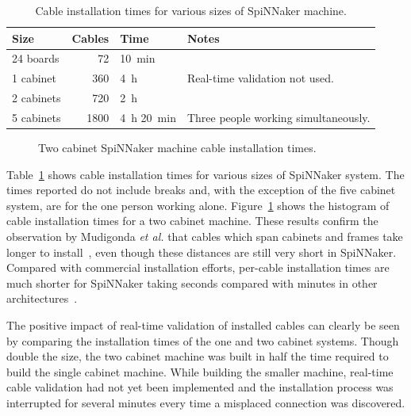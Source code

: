 			\begin{table}
				\center
				\begin{tabular}{lrll}
					\toprule
						Size & Cables & Time & Notes \\
					\midrule
						24 boards  & \num{72}   & \SI{10}{\minute} & \\
						1 cabinet  & \num{360}  & \SI{4}{\hour} &
							Real-time validation not used. \\
						2 cabinets & \num{720}  & \SI{2}{\hour} & \\
						5 cabinets & \num{1800} & \SI{4}{\hour} \SI{20}{\minute} &
							Three people working simultaneously. \\
					\bottomrule
				\end{tabular}
				
				\caption[Cable installation times for various SpiNNaker machines.]%
				{Cable installation times for various sizes of SpiNNaker
				machine.}
				\label{tab:install-time}
			\end{table}
			
			\begin{figure}
				
				\caption{Two cabinet SpiNNaker machine cable installation times.}
				\label{fig:install-histogram}
			\end{figure}
			
			Table~\ref{tab:install-time} shows cable installation times for various
			sizes of SpiNNaker system. The times reported do not include breaks and,
			with the exception of the five cabinet system, are for the one person
			working alone.  Figure~\ref{fig:install-histogram} shows the histogram of
			cable installation times for a two cabinet machine.  These results
			confirm the observation by Mudigonda \emph{et al.} that cables which span
			cabinets and frames take longer to install~\cite{mudigonda11}, even
			though these distances are still very short in SpiNNaker. Compared with
			commercial installation efforts, per-cable installation times are much
			shorter for SpiNNaker taking seconds compared with minutes in other
			architectures~\cite{mudigonda11}.
			
			The positive impact of real-time validation of installed cables can
			clearly be seen by comparing the installation times of the one and two
			cabinet systems. Though double the size, the two cabinet machine was
			built in half the time required to build the single cabinet machine.
			While building the smaller machine, real-time cable validation had not
			yet been implemented and the installation process was interrupted for
			several minutes every time a misplaced connection was discovered.
			
